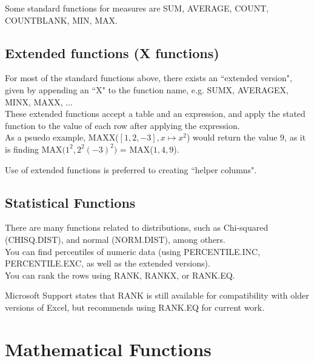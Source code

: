 \documentclass[10pt, openany, twocolumn]{book}
\begin{document}
Some standard functions for measures are SUM, AVERAGE, COUNT, COUNTBLANK, MIN, MAX.

\subsection*{Extended functions (X functions)}

For most of the standard functions above, there exists an ``extended version", given by appending an ``X" to the function name, e.g. SUMX, AVERAGEX, MINX, MAXX, ... \\

These extended functions accept a table and an expression, and apply the stated function to the value of each row after applying the expression. \\

As a psuedo example, MAXX($[1,2,-3], x \mapsto x^2$) would return the value $9$, as it is finding MAX$\big(1^2,2^2(-3)^2\big)$ = MAX($1,4,9$).\\

\begin{tcolorbox}[colback=yellow!2!white, colframe=yellow!60!gray]
Use of extended functions is preferred to creating ``helper columns".
\end{tcolorbox}

\subsection*{Statistical Functions}

There are many functions related to distributions, such as Chi-squared (CHISQ.DIST), and normal (NORM.DIST), among others.\\

You can find percentiles of numeric data (using PERCENTILE.INC, PERCENTILE.EXC, as well as the extended versions).\\

You can rank the rows using RANK, RANKX, or RANK.EQ.

\begin{tcolorbox}[colback=yellow!2!white, colframe=yellow!60!gray]
Microsoft Support states that RANK is still available for compatibility with older versions of Excel, but recommends using RANK.EQ for current work.
\end{tcolorbox}


\section{Mathematical Functions}
\end{document}
